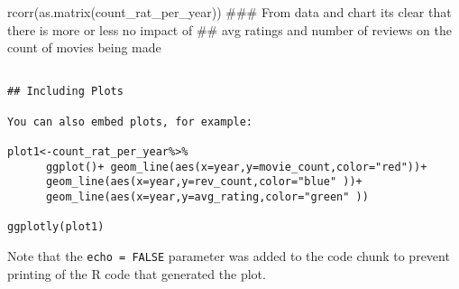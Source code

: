 \documentclass[]{article}
\begin{document}
rcorr(as.matrix(count\_rat\_per\_year)) \#\#\# From data and chart its
clear that there is more or less no impact of \#\# avg ratings and
number of reviews on the count of movies being made

\begin{verbatim}

## Including Plots

You can also embed plots, for example:

plot1<-count_rat_per_year%>%
      ggplot()+ geom_line(aes(x=year,y=movie_count,color="red"))+
      geom_line(aes(x=year,y=rev_count,color="blue" ))+
      geom_line(aes(x=year,y=avg_rating,color="green" ))

ggplotly(plot1)
\end{verbatim}

Note that the \texttt{echo\ =\ FALSE} parameter was added to the code
chunk to prevent printing of the R code that generated the plot.
\end{document}
